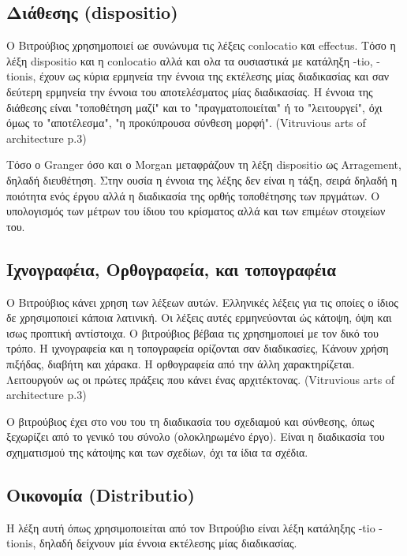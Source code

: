 \subsection{Διάθεσης (dispositio)}
  
  Ο Βιτρούβιος χρησημοποιεί ωε συνώνυμα τις λέξεις conlocatio και effectus. 
  Τόσο η λέξη dispositio και η conlocatio αλλά και ολα τα ουσιαστικά με 
  κατάληξη -tio, -tionis, έχουν ως κύρια ερμηνεία την έννοια της εκτέλεσης μίας 
  διαδικασίας και σαν δεύτερη ερμηνεία την έννοια του αποτελέσματος μίας 
  διαδικασίας. Η έννοια της διάθεσης είναι "τοποθέτηση μαζί" και το 
  "πραγματοποιείται" ή το "λειτουργεί", όχι όμως το "αποτέλεσμα", "η 
  προκύπρουσα σύνθεση μορφή". (Vitruvious arts of architecture p.3)
  
  Τόσο ο Granger όσο και ο Morgan μεταφράζουν τη λέξη dispositio ως Arragement, δηλαδή διευθέτηση. Στην ουσία η έννοια της λέξης δεν είναι η τάξη, σειρά δηλαδή η ποιότητα ενός έργου αλλά η διαδικασία της ορθής τοποθέτησης των πργμάτων. Ο υπολογισμός των μέτρων του ίδιου του κρίσματος αλλά και των επιμέων στοιχείων του.
  
\subsection{Ιχνογραφέια, Ορθογραφεία, και τοπογραφέια}
  
  Ο Βιτρούβιος κάνει χρηση των λέξεων αυτών. Ελληνικές λέξεις για τις οποίες ο ίδιος δε χρησιμοποιεί κάποια λατινική. Οι λέξεις αυτές ερμηνεύονται ώς κάτοψη, όψη και ισως προπτική αντίστοιχα. Ο βιτρούβιος βέβαια τις χρησημοποιεί με τον δικό του τρόπο. Η ιχνογραφεία και η τοπογραφεία ορίζονται σαν διαδικασίες, Κάνουν χρήση πιξήδας, διαβήτη και χάρακα. Η ορθογραφεία από την άλλη χαρακτηρίζεται. Λειτουργούν ως οι πρώτες πράξεις που κάνει ένας αρχιτέκτονας. (Vitruvious arts of architecture p.3)
  
  Ο βιτρούβιος έχει στο νου του τη διαδικασία του σχεδιαμού και σύνθεσης, όπως ξεχωρίζει από το γενικό του σύνολο (ολοκληρωμένο έργο). Είναι η διαδικασία του σχηματισμού της κάτοψης και των σχεδίων, όχι τα ίδια τα σχέδια.
  
\subsection{Οικονομία (Distributio)}

  Η λέξη αυτή όπως χρησιμοποιείται από τον Βιτρούβιο είναι λέξη κατάληξης -tio -tionis, δηλαδή δείχνουν μία έννοια εκτέλεσης μίας διαδικασίας.
  
